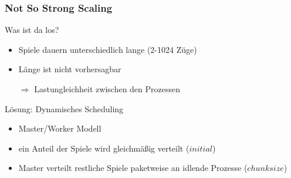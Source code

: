\begin{frame}
    \frametitle{Not So Strong Scaling}

    Was ist da los?
    \begin{itemize}
        \item Spiele dauern unterschiedlich lange (2-1024 Züge)
        \item Länge ist nicht vorhersagbar
        \item[$\Rightarrow$] Lastungleichheit zwischen den Prozessen
    \end{itemize}

    \hfill

    Lösung: Dynamisches Scheduling
    \begin{itemize}
        \item Master/Worker Modell
        \item ein Anteil der Spiele wird gleichmäßig verteilt ($initial$)
        \item Master verteilt restliche Spiele paketweise an idlende Prozesse
              ($chunksize$)
    \end{itemize}

\end{frame}

